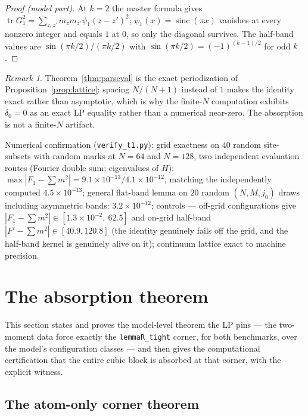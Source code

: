 \documentclass[11pt]{article}
\theoremstyle{plain}
\theoremstyle{definition}
\theoremstyle{remark}
\newtheorem*{remk}{Remark}
\newcommand{\tr}{\operatorname{tr}}
\newcommand{\sinc}{\operatorname{sinc}}
\begin{document}
\begin{proof}[Proof (model part)]
At $k = 2$ the master formula gives
$\tr G_1^2 = \sum_{z, z'} m_z m_{z'} \psi_1(z - z')^2$;
$\psi_1(x) = \sinc(\pi x)$ vanishes at every nonzero integer and equals $1$ at
$0$, so only the diagonal survives. The half-band values are
$\sin(\pi k/2)/(\pi k/2)$ with $\sin(\pi k/2) = (-1)^{(k-1)/2}$ for odd $k$.
\end{proof}

\begin{remk}
Theorem~\ref{thm:parseval} is the exact periodization of
Proposition~\ref{prop:lattice}: spacing $N/(N+1)$ instead of $1$ makes the
identity exact rather than asymptotic, which is why the finite-$N$ computation
exhibits $\delta_0 = 0$ as an exact LP equality rather than a numerical
near-zero. The absorption is not a finite-$N$ artifact.
\end{remk}

Numerical confirmation (\texttt{verify\_t1.py}): grid exactness on $40$ random
site-subsets with random marks at $N = 64$ and $N = 128$, two independent
evaluation routes (Fourier double sum; eigenvalues of $H$):
$\max |F_1 - \sum m^2| = 9.1 \times 10^{-13} / 4.1 \times 10^{-12}$, matching
the independently computed $4.5 \times 10^{-13}$; general flat-band lemma on
$20$ random $(N, M, j_0)$ draws including asymmetric bands:
$3.2 \times 10^{-12}$; controls --- off-grid configurations give
$|F_1 - \sum m^2| \in [1.3 \times 10^{-2},\ 62.5]$ and on-grid half-band
$|F' - \sum m^2| \in [40.9, 120.8]$ (the identity genuinely fails off the grid,
and the half-band kernel is genuinely alive on it); continuum lattice exact to
machine precision.

\section{The absorption theorem}
\label{sec:absorption}

This section states and proves the model-level theorem the LP pins --- the
two-moment data force exactly the \texttt{lemmaR\_tight} corner, for both
benchmarks, over the model's configuration classes --- and then gives the
computational certification that the entire cubic block is absorbed at that
corner, with the explicit witness.

\subsection{The atom-only corner theorem}
\label{sec:atomonly}
\end{document}
